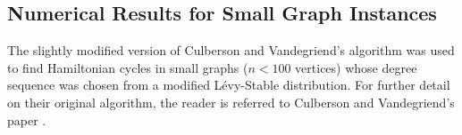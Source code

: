 \documentclass[twoside,11pt]{article}
\begin{document}
%
%
%


\subsection{Numerical Results for Small Graph Instances}
\label{ham_complete_small}

The slightly modified version of Culberson and Vandegriend's algorithm was used 
to find Hamiltonian cycles in small graphs ($n < 100$ vertices)  whose degree sequence
was chosen from a modified L\'evy-Stable distribution.  For further
detail on their original algorithm, 
the reader is referred to Culberson and Vandegriend's paper \citeyear{vandegriend}.
\end{document}
